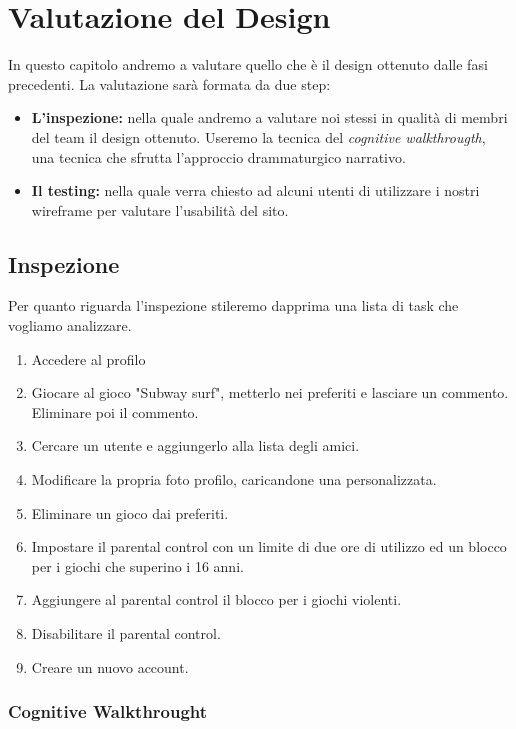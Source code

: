 \documentclass[../Report.tex]{subfiles}
\begin{document}
    \chapter{Valutazione del Design}
    In questo capitolo andremo a valutare quello che è il design ottenuto dalle fasi precedenti. La valutazione sarà formata da due step:
    \begin{itemize}
        \item \textbf{L'inspezione:} nella quale andremo a valutare noi stessi in qualità di membri del team il design ottenuto. Useremo la tecnica del \emph{cognitive walkthrougth}, una tecnica che sfrutta l'approccio drammaturgico narrativo.
        \item  \textbf{Il testing:} nella quale verra chiesto ad alcuni utenti di utilizzare i nostri wireframe per valutare l'usabilità del sito. 
    \end{itemize}

    \section{Inspezione}
    Per quanto riguarda l'inspezione stileremo dapprima una lista di task che vogliamo analizzare.
    \begin{enumerate}
        \item Accedere al profilo
        \item Giocare al gioco "Subway surf", metterlo nei preferiti e lasciare un commento. Eliminare poi il commento.
        \item Cercare un utente e aggiungerlo alla lista degli amici.
        \item Modificare la propria foto profilo, caricandone una personalizzata.
        \item Eliminare un gioco dai preferiti.
        \item Impostare il parental control con un limite di due ore di utilizzo ed un blocco per i giochi che superino i 16 anni.
        \item Aggiungere al parental control il blocco per i giochi violenti.
        \item Disabilitare il parental control.
        \item Creare un nuovo account.
    \end{enumerate}
    \subsection{Cognitive Walkthrought}
\end{document}
